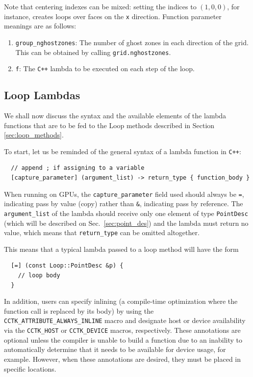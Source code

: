 Note that centering indexes can be mixed: setting the indices to $(1,0,0)$, for instance, creates loops over faces on the \texttt{x} direction. Function parameter meanings are as follows:

\begin{enumerate}
  \item \texttt{group\_nghostzones}: The number of ghost zones in each direction of the grid. This can be obtained by calling \texttt{grid.nghostzones}.
  \item \texttt{f}: The \texttt{C++} lambda to be executed on each step of the loop.
\end{enumerate}

\subsection{Loop Lambdas}

We shall now discuss the syntax and the available elements of the lambda functions that are to be fed to the Loop methods described in Section \ref{sec:loop_methods}.

To start, let us be reminded of the general syntax of a lambda function in \texttt{C++}:

\begin{verbatim}
  // append ; if assigning to a variable
  [capture_parameter] (argument_list) -> return_type { function_body }
\end{verbatim}

When running on GPUs, the \texttt{capture\_parameter} field used should always be \texttt{=}, indicating pass by value (copy) rather than \texttt{\&}, indicating pass by reference. The \texttt{argument\_list} of the lambda should receive only one element of type \texttt{PointDesc} (which will be described on Sec.~\ref{sec:point_des}) and the lambda must return no value, which means that \texttt{return\_type} can be omitted altogether.

This means that a typical lambda passed to a loop method will have the form
%
\begin{verbatim}
  [=] (const Loop::PointDesc &p) {
    // loop body
  }
\end{verbatim}

In addition, users can specify inlining (a compile-time optimization where the function call is replaced by its body) by using the \texttt{CCTK\_ATTRIBUTE\_ALWAYS\_INLINE} macro and designate host or device availability via the \texttt{CCTK\_HOST} or \texttt{CCTK\_DEVICE} macros, respectively. These annotations are optional unless the compiler is unable to build a function due to an inability to automatically determine that it needs to be available for device usage, for example. However, when these annotations are desired, they must be placed in specific locations.

